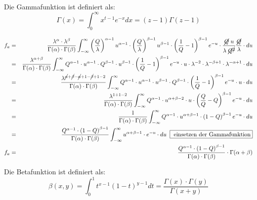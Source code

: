 \begin{uebsp}
\begin{Answer}
\begin{uebsp_theory}
Die Gammafunktion ist definiert als:
\[\Gamma(x)=\int_0^\infty x^{t-1}e^{-x}dx=(z-1)\Gamma(z-1)\]
\end{uebsp_theory}

\begin{eqnarray*}
f_a &=& \frac{\lambda^\alpha\cdot \lambda^\beta}{\Gamma(\alpha)\cdot \Gamma(\beta)}\int_{-\infty}^\infty \left(\frac{Q}{\lambda}\right)^{\alpha-1}u^{\alpha-1} \cdot \left(\frac{Q}{\lambda}\right)^{\beta-1}u^{\beta-1}\cdot \left(\frac{1}{Q}-1\right)^{\beta-1}e^{-u}\cdot \frac{\cancel{Q}\;u}{\lambda\;\cancel{Q}^{\cancel{2}}} \dfrac{\cancel{Q}}{\lambda} \cdot du\\
 &=& \frac{\lambda^{\alpha+\beta}}{\Gamma(\alpha)\cdot \Gamma(\beta)}\int_{-\infty}^\infty Q^{\alpha-1}\cdot u^{\alpha-1} \cdot Q^{\beta-1}\cdot u^{\beta-1}\cdot \left(\frac{1}{Q}-1\right)^{\beta-1}e^{-u}\cdot u\cdot \lambda^{-2}\cdot \lambda^{-\beta+1}\cdot \lambda^{-\alpha+1} \cdot du\\
 &=& \frac{\lambda^{\cancel{\alpha}+\cancel{\beta}-\cancel{\alpha}+1-\cancel{\beta}+1-2}}{\Gamma(\alpha)\cdot \Gamma(\beta)}\int_{-\infty}^\infty Q^{\alpha-1}\cdot u^{\alpha-1} \cdot u^{\beta-1}\cdot  Q^{\beta-1}\cdot \left(\frac{1}{Q}-1\right)^{\beta-1}e^{-u}\cdot u \cdot du\\
 &=& \frac{\lambda^{1+1-2}}{\Gamma(\alpha)\cdot \Gamma(\beta)}\int_{-\infty}^\infty Q^{\alpha-1}\cdot u^{\alpha+\beta-2}\cdot u\cdot \left(\frac{Q}{Q}-Q\right)^{\beta-1}e^{-u}\cdot du\\
 &=& \frac{1}{\Gamma(\alpha)\cdot \Gamma(\beta)}\int_{-\infty}^\infty Q^{\alpha-1}\cdot u^{\alpha+\beta-1}\cdot \left(1-Q\right)^{\beta-1}e^{-u} \cdot du\\
 &=& \frac{Q^{\alpha-1}\cdot \left(1-Q\right)^{\beta-1}}{\Gamma(\alpha)\cdot \Gamma(\beta)}\int_{-\infty}^\infty u^{\alpha+\beta-1}\cdot e^{-u} \cdot du\;\;\fbox{ einsetzen der Gammafunktion}\\
f_a &=& \frac{Q^{\alpha-1}\cdot \left(1-Q\right)^{\beta-1}}{\Gamma(\alpha)\cdot \Gamma(\beta)}\cdot \Gamma(\alpha+\beta)
\end{eqnarray*}

\begin{uebsp_theory}
Die Betafunktion ist definiert als:
\[\beta(x,y)=\int_0^1t^{x-1}(1-t)^{y-1}dt=\frac{\Gamma(x)\cdot\Gamma(y)}{\Gamma(x+y)}\]
\end{uebsp_theory}


\end{Answer}
\end{uebsp}

